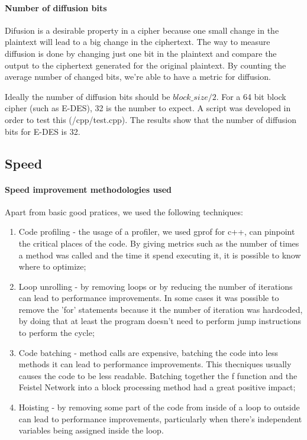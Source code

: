 \documentclass{article} %
\begin{document}
\paragraph{Number of diffusion bits}
Difusion is a desirable property in a cipher because one small change in the plaintext will lead to a big change in the ciphertext. 
The way to measure diffusion is done by changing just one bit in the plaintext and compare the output to the ciphertext generated for the original plaintext. By counting the average number
of changed bits, we're able to have a metric for diffusion. 

Ideally the number of diffusion bits should be $block\_size/2$. For a 64 bit block cipher (such as E-DES), 32 is the number to expect. A script was developed in order
to test this (/cpp/test.cpp). The results show that the number of diffusion bits for E-DES is 32.


\subsection{Speed}
\label{speedinp}
\paragraph{Speed improvement methodologies used}

Apart from basic good pratices, we used the following techniques:
\begin{enumerate}
  \item Code profiling - the usage of a profiler, we used gprof for c++, can pinpoint the critical places of the code. By giving metrics such as the number of 
  times a method was called and the time it spend executing it, it is possible to know where to optimize;
  \item Loop unrolling - by removing loops or by reducing the number of iterations can lead to performance improvements. In some cases it was possible to remove the 'for'
  statements because it the number of iteration was hardcoded, by doing that at least the program doesn't need to perform jump instructions to perform the cycle;
  \item Code batching - method calls are expensive, batching the code into less methods it can lead to performance improvements. This thecniques usually causes the code 
  to be less readable. Batching together the f function and the Feistel Network into a block processing method had a great positive impact;
  \item Hoisting - by removing some part of the code from inside of a loop to outside can lead to performance improvements, particularly when there's independent variables being
  assigned inside the loop.
\end{enumerate}
\end{document}
